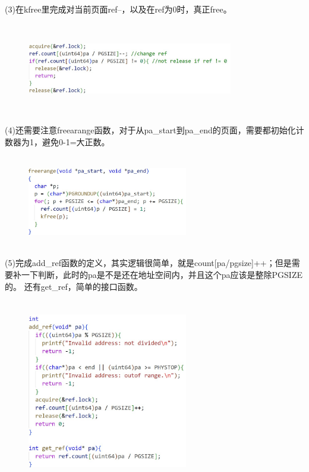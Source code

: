\documentclass[12pt]{article}
\begin{document}
\noindent(3)在kfree里完成对当前页面ref--，以及在ref为0时，真正free。
\begin{figure}[H]
    \centering
    \includegraphics[height=4cm,width=9cm]{lab5-5.jpg}
\end{figure}
\noindent(4)还需要注意freearange函数，对于从pa\_start到pa\_end的页面，需要都初始化计数器为1，避免0-1=大正数。\\
\begin{figure}[H]
    \centering
    \includegraphics[height=4cm,width=7cm]{lab5-4.jpg}
\end{figure}
\newpage
\noindent(5)完成add\_ref函数的定义，其实逻辑很简单，就是count[pa/pgsize]++；但是需要补一下判断，此时的pa是不是还在地址空间内，并且这个pa应该是整除PGSIZE的。
还有get\_ref，简单的接口函数。
\begin{figure}[H]
    \centering
    \includegraphics[height=8cm,width=7cm]{lab5-7.jpg}
\end{figure}\par
\end{document}
